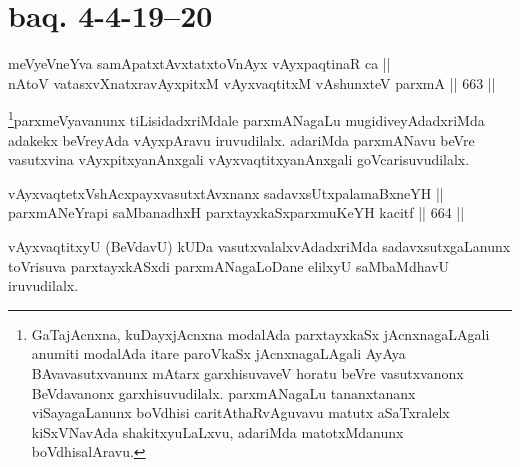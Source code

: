 \section*{baq. 4-4-19{\rm --}20}

\begin{shl}
meVyeVneYva samApatxtAvxtatxtoV\s nAyx vAyxpaqtinaR ca || \\
nAtoV vatasxvXnatxravAyxpitxM vAyxvaqtitxM vA\s shunxteV parxmA \hfill || 663 ||  
\end{shl}

\begin{artha}
\footnote{GaTajAcnxna, kuDayxjAcnxna modalAda parxtayxkaSx jAcnxnagaLAgali anumiti modalAda itare paroVkaSx jAcnxnagaLAgali AyAya BAvavasutxvanunx mAtarx garxhisuvaveV horatu beVre vasutxvanonx BeVdavanonx garxhisuvudilalx. parxmANagaLu tananxtananx viSayagaLanunx boVdhisi caritAthaRvAguvavu matutx aSaTxralelx kiSxVNavAda shakitxyuLaLxvu, adariMda matotxMdanunx boVdhisalAravu.}parxmeVyavanunx tiLisidadxriMdale parxmANagaLu mugidiveyAdadxriMda adakekx beVreyAda vAyxpAravu iruvudilalx. adariMda parxmANavu beVre vasutxvina vAyxpitxyanAnxgali vAyxvaqtitxyanAnxgali goVcarisuvudilalx.
\end{artha}

\begin{shl}
vAyxvaqtetxVshAcxpayxvasutxtAvxnanx sadavxsUtxpalamaBxneYH || \\
parxmANeYrapi saMbanadhxH parxtayxkaSxparxmuKeYH kacitf \hfill || 664 ||  
\end{shl}

\begin{artha}
vAyxvaqtitxyU (BeVdavU) kUDa vasutxvalalxvAdadxriMda 
sadavxsutxgaLanunx toVrisuva parxtayxkASxdi parxmANagaLoDane elilxyU 
saMbaMdhavU iruvudilalx.
\end{artha}

